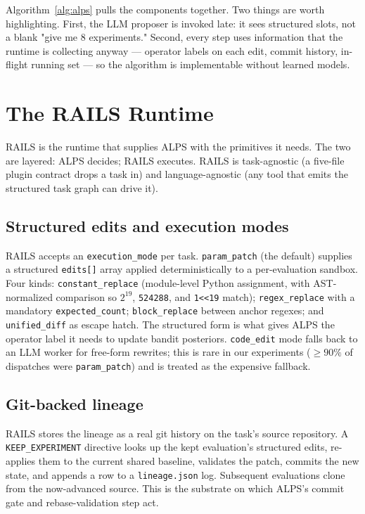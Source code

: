 \documentclass{article}
\newcommand{\alps}{ALPS\xspace}
\newcommand{\rails}{RAILS\xspace}
\newcommand{\keep}{\texttt{KEEP\_EXPERIMENT}\xspace}
\begin{document}
Algorithm~\ref{alg:alps} pulls the components together. Two things are worth highlighting. First, the LLM proposer is invoked late: it sees structured slots, not a blank "give me 8 experiments." Second, every step uses information that the runtime is collecting anyway --- operator labels on each edit, commit history, in-flight running set --- so the algorithm is implementable without learned models.

\section{The RAILS Runtime}
\label{sec:rails}

\rails is the runtime that supplies \alps with the primitives it needs. The two are layered: \alps decides; \rails executes. \rails is task-agnostic (a five-file plugin contract drops a task in) and language-agnostic (any tool that emits the structured task graph can drive it).

\subsection{Structured edits and execution modes}

\rails accepts an \texttt{execution\_mode} per task. \texttt{param\_patch} (the default) supplies a structured \texttt{edits[]} array applied deterministically to a per-evaluation sandbox. Four kinds: \texttt{constant\_replace} (module-level Python assignment, with AST-normalized comparison so $2^{19}$, \texttt{524288}, and \texttt{1<<19} match); \texttt{regex\_replace} with a mandatory \texttt{expected\_count}; \texttt{block\_replace} between anchor regexes; and \texttt{unified\_diff} as escape hatch. The structured form is what gives \alps the operator label it needs to update bandit posteriors. \texttt{code\_edit} mode falls back to an LLM worker for free-form rewrites; this is rare in our experiments ($\geq 90\%$ of dispatches were \texttt{param\_patch}) and is treated as the expensive fallback.

\subsection{Git-backed lineage}

\rails stores the lineage as a real git history on the task's source repository. A \keep directive looks up the kept evaluation's structured edits, re-applies them to the current shared baseline, validates the patch, commits the new state, and appends a row to a \texttt{lineage.json} log. Subsequent evaluations clone from the now-advanced source. This is the substrate on which \alps's commit gate and rebase-validation step act.
\end{document}
